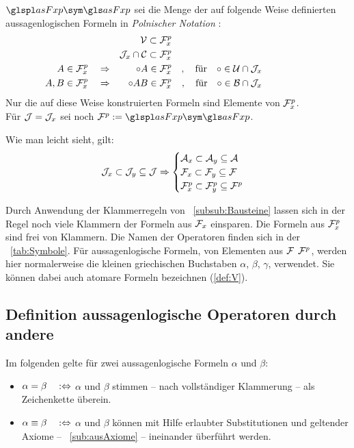 $\glsSym{asFxp}$ sei die Menge der auf folgende Weise definierten aussagenlogischen Formeln in \emph{Polnischer Notation}%
:
\begin{align}
&                & \mathcal{V}            \subset \mathcal{F}_x^p
\\
&                & \mathcal{J}_x \cap \mathcal{C} \subset \mathcal{F}_x^p
\\
A                            \in \mathcal{F}_x^p
& \quad \Rightarrow & \circ A   \in \mathcal{F}_x^p
& & , \quad \text{für} \quad \circ \in \mathcal{U} \cap \mathcal{J}_x
\\
A, B                         \in \mathcal{F}_x^p
& \quad \Rightarrow & \circ A B \in \mathcal{F}_x^p
& & , \quad \text{für} \quad \circ \in \mathcal{B} \cap \mathcal{J}_x
&&&&&&&&&&
\end{align}
Nur die auf diese Weise konstruierten Formeln sind Elemente von $\mathcal{F}_x^p$.
\\Für $\mathcal{J} = \mathcal{J}_x$ sei noch $\asFp \defeq \glsSym{asFxp}$.

Wie man leicht sieht, gilt:
\begin{equation}
\mathcal{J}_x \subset \mathcal{J}_y \subseteq \mathcal{J} \Rightarrow
\begin{cases}
\mathcal{A}_x  \subset \mathcal{A}_y  \subseteq \mathcal{A} \\
\mathcal{F}_x  \subset \mathcal{F}_y  \subseteq \mathcal{F} \\
\mathcal{F}_x^p \subset \mathcal{F}_y^p \subseteq \mathcal{F}^p
\end{cases}
\end{equation}

Durch Anwendung der Klammerregeln von \subsubsectionname~\vref{subsub:Bausteine} lassen sich in der Regel noch viele Klammern der Formeln aus $\mathcal{F}_x$ einsparen.
Die Formeln aus $\mathcal{F}_x^p$ sind frei von Klammern.
Die Namen der Operatoren finden sich in der \tablename~\vref{tab:Symbole}.
Für aussagenlogische Formeln, \textdh von Elementen aus $\mathcal{F}$ \textbzw $\mathcal{F}^p$, werden hier normalerweise die kleinen griechischen Buchstaben $\alpha$, $\beta$, $\gamma$, \textusw verwendet.
Sie können dabei auch atomare Formeln bezeichnen (\seename \eqref{def:V}).

\subsection{Definition aussagenlogische Operatoren durch andere}%
\label{sub:ausOperatorDef}

Im folgenden gelte für zwei aussagenlogische Formeln $\alpha$ und $\beta$:
\begin{itemize}
	
	\item $\alpha  =   \beta \quad :\Leftrightarrow$ \quad $\alpha$ und $\beta$ stimmen -- \textggf nach vollständiger Klammerung -- als Zeichenkette überein.
	
	\item $\alpha \equiv \beta \quad :\Leftrightarrow$ \quad $\alpha$ und $\beta$ können mit Hilfe erlaubter Substitutionen und geltender Axiome -- \seename~\vref{sub:ausAxiome} -- ineinander überführt werden.
	
\end{itemize}

